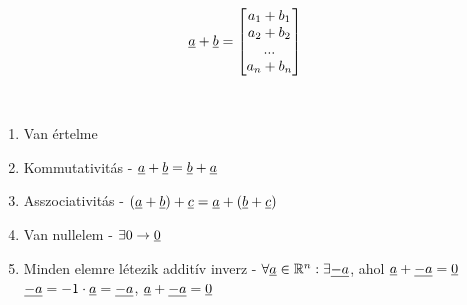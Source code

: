   \begin{frame}  
  
	\begin{tcolorbox}[title={Def.: Összeadás}]	
		\begin{align}
			\underline{a} + \underline{b} &= \begin{bmatrix}
				a_1 + b_1 \\
				a_2 + b_2 \\
				... \\
				a_n + b_n
			\end{bmatrix}
		\end{align}
				
		\tcblower
		
		 \\
		
		\msmallskip
		
		\begin{enumerate}
			\item Van értelme
			\item Kommutativitás - $\underline{a} + \underline{b} = \underline{b} + \underline{a}$
			\item Asszociativitás - $(\underline{a} + \underline{b}) + \underline{c} = \underline{a} + (\underline{b} + \underline{c})$
			\item Van nullelem - ${\exists}0 \rightarrow \underline{0}$
			\item Minden elemre létezik additív inverz - ${\forall}\underline{a} \in \mathbb{R}^n : {\exists}\underline{-a}$, ahol $\underline{a} + \underline{-a} = \underline{0}$ \\
			$\underline{-a} = -1 \cdot \underline{a} = \underline{-a}$, $\underline{a} + \underline{-a} = \underline{0}$
		\end{enumerate}				
	\end{tcolorbox}

  \end{frame}
  
